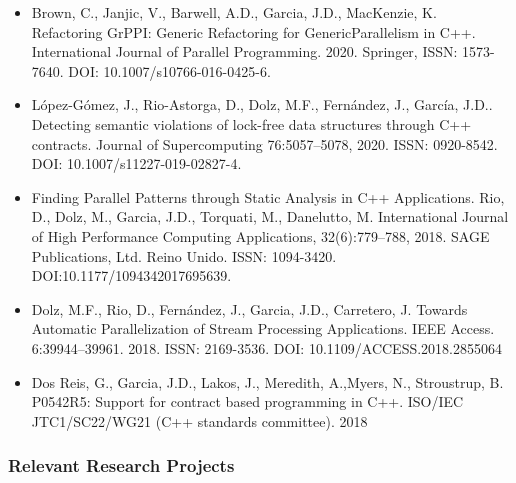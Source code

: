 \documentclass[a4paper,11pt]{article}
\begin{document}
\begin{itemize}

\item
Brown, C., Janjic, V., Barwell, A.D., Garcia, J.D., MacKenzie, K. 
Refactoring GrPPI: Generic Refactoring for GenericParallelism in C++. 
International Journal of Parallel Programming. 2020. Springer, 
ISSN: 1573-7640. 
DOI: 10.1007/s10766-016-0425-6.


\item 
López-Gómez, J., Rio-Astorga, D., Dolz, M.F., Fernández, J., García, J.D.. 
Detecting semantic violations of lock-free data structures through C++ contracts.
Journal of Supercomputing 76:5057–5078, 2020. 
ISSN: 0920-8542. 
DOI: 10.1007/s11227-019-02827-4.

\item
Finding Parallel Patterns through Static Analysis in C++ Applications. 
Rio, D., Dolz, M., Garcia, J.D., Torquati, M., Danelutto, M. 
International Journal of High Performance Computing Applications, 32(6):779–788, 2018. 
SAGE Publications, Ltd. Reino Unido. 
ISSN: 1094-3420. 
DOI:10.1177/1094342017695639.

\item
Dolz, M.F., Rio, D., Fernández, J., Garcia, J.D., Carretero, J.
Towards Automatic Parallelization of Stream Processing Applications.
IEEE Access. 6:39944–39961. 2018. 
ISSN: 2169-3536. 
DOI: 10.1109/ACCESS.2018.2855064

\item
Dos Reis, G., Garcia, J.D., Lakos, J., Meredith, A.,Myers, N., Stroustrup, B. 
P0542R5: Support for contract based programming in C++. 
ISO/IEC JTC1/SC22/WG21 (C++ standards committee). 2018


\end{itemize}

\subsubsection*{Relevant Research Projects}
\end{document}
